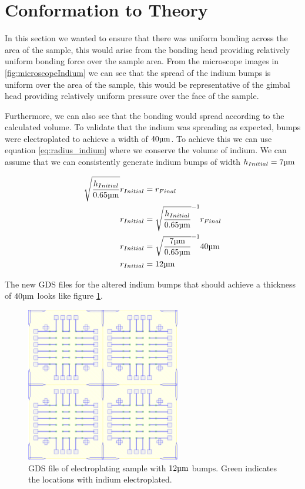 \section{Conformation to Theory}
In this section we wanted to ensure that there was uniform bonding across the area of the sample, this would arise from the bonding head providing relatively uniform bonding force over the sample area. From the microscope images in \ref{fig:microscopeIndium} we can see that the spread of the indium bumps is uniform over the area of the sample, this would be representative of the gimbal head providing relatively uniform pressure over the face of the sample.

Furthermore, we can also see that the bonding would spread according to the calculated volume.
To validate that the indium was spreading as expected, bumps were electroplated to achieve a width of $40 \um$. To achieve this we can use equation \ref{eq:radius_indium} where we conserve the volume of indium. We can assume that we can consistently generate indium bumps of width $h_{Initial} = 7\um$


\begin{equation} \label{eq:initial_radius}
    \begin{split}
        \sqrt{\frac{h_{Initial}}{ 0.65 \um}} r_{Initial} &= r_{Final} \\
        r_{Initial} &= \sqrt{\frac{h_{Initial}}{ 0.65 \um}}^{-1}r_{Final} \\
        r_{Initial} &= \sqrt{\frac{7 \um}{ 0.65 \um}}^{-1} 40 \um \\
        r_{Initial} &= 12 \um
    \end{split}
\end{equation}

The new GDS files for the altered indium bumps that should achieve a thickness of $40 \um$ looks like figure \ref{fig:12um_bumps}.


\begin{figure}
    \centering
    \includegraphics[width=0.6\textwidth]{Main/Ch2/DC_DieBTest_V212um_tex_output.pdf}
    \caption{GDS file of electroplating sample with $12\um$ bumps. Green indicates the locations with indium electroplated. }
    \label{fig:12um_bumps}
\end{figure}

